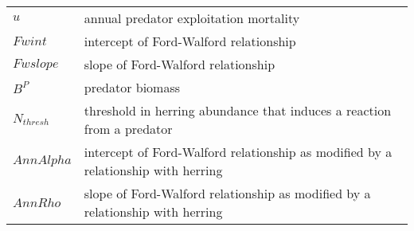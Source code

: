\documentclass[]{article}
\begin{document}
\begin{longtable}[]{@{}ll@{}}
\begin{minipage}[t]{0.13\columnwidth}
\(u\)\strut
\end{minipage} & \begin{minipage}[t]{0.76\columnwidth}\raggedright\strut
annual predator exploitation mortality\strut
\end{minipage}\tabularnewline
\begin{minipage}[t]{0.13\columnwidth}\raggedright\strut
\(Fwint\)\strut
\end{minipage} & \begin{minipage}[t]{0.76\columnwidth}\raggedright\strut
intercept of Ford-Walford relationship\strut
\end{minipage}\tabularnewline
\begin{minipage}[t]{0.13\columnwidth}\raggedright\strut
\(Fwslope\)\strut
\end{minipage} & \begin{minipage}[t]{0.76\columnwidth}\raggedright\strut
slope of Ford-Walford relationship\strut
\end{minipage}\tabularnewline
\begin{minipage}[t]{0.13\columnwidth}\raggedright\strut
\(B^P\)\strut
\end{minipage} & \begin{minipage}[t]{0.76\columnwidth}\raggedright\strut
predator biomass\strut
\end{minipage}\tabularnewline
\begin{minipage}[t]{0.13\columnwidth}\raggedright\strut
\(N_{thresh}\)\strut
\end{minipage} & \begin{minipage}[t]{0.76\columnwidth}\raggedright\strut
threshold in herring abundance that induces a reaction from a
predator\strut
\end{minipage}\tabularnewline
\begin{minipage}[t]{0.13\columnwidth}\raggedright\strut
\(AnnAlpha\)\strut
\end{minipage} & \begin{minipage}[t]{0.76\columnwidth}\raggedright\strut
intercept of Ford-Walford relationship as modified by a relationship
with herring\strut
\end{minipage}\tabularnewline
\begin{minipage}[t]{0.13\columnwidth}\raggedright\strut
\(AnnRho\)\strut
\end{minipage} & \begin{minipage}[t]{0.76\columnwidth}\raggedright\strut
slope of Ford-Walford relationship as modified by a relationship with
herring\strut
\end{minipage}\tabularnewline

\end{longtable}
\end{document}
